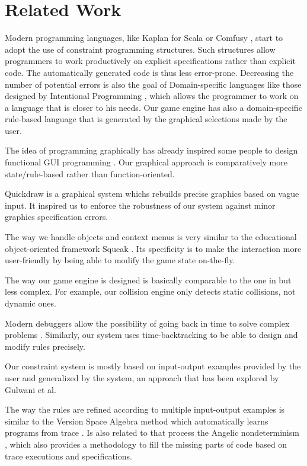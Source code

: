 \documentclass[12pt]{article} %
\begin{document}
\section{Related Work}

Modern programming languages, like Kaplan for Scala
\cite{koksal_constraints_2012} or Comfusy \cite{kuncak_comfusy:_2010}, start to
adopt the use of constraint programming structures. Such structures allow
programmers to work productively on explicit specifications rather than
explicit code. The automatically generated code is thus less error-prone.
Decreasing the number of potential errors is also the goal of Domain-specific
languages like those designed by Intentional Programming
\cite{simonyi_intentional_2006}, which allows the programmer to work on a
language that is closer to his needs.
Our game engine has also a domain-specific rule-based language that is
generated by the graphical selections made by the user.

The idea of programming graphically has already inspired some people to
design functional GUI programming \cite{elliott_genuinely_2001}. Our
graphical approach is comparatively more state/rule-based rather than
function-oriented.

Quickdraw \cite{cheema_quickdraw:_2012} is a graphical system whichs
rebuilds precise graphics based on vague input. It inspired us to
enforce the robustness of our system against minor graphics specification errors.

The way we handle objects and context menus is very similar to the educational
object-oriented framework Squeak \cite{sanchez-ruiz_funfonts:_2008}. Its
specificity is to make the interaction more user-friendly by being able to
modify the game state on-the-fly.

The way our game engine is designed is basically comparable to the one in
\cite{bishop_designing_1998} but less complex. For example, our
collision engine only detects static collisions, not dynamic ones.

Modern debuggers allow the possibility of going back in time to solve complex
problems
\cite{ko_debugging_2008}. Similarly, our system uses time-backtracking to be
able to design and modify rules precisely.

Our constraint system is mostly based on input-output examples provided by the
user and generalized by the system, an approach that has been
explored by Gulwani et al.
\cite{singh_synthesizing_2012,gulwani_synthesis_2012}

The way the rules are refined according to multiple input-output examples is
similar to the Version Space Algebra method which automatically learns 
programs from trace \cite{lau_learning_2003}. Is also related to that
process the Angelic nondeterminism \cite{bodik_programming_2010}, which also
provides a methodology to fill the missing parts of code based on trace
executions and specifications.
\end{document}
